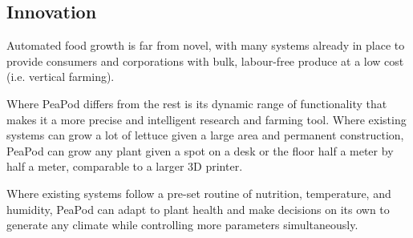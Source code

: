\documentclass{report}
\begin{document}
\subsection{Innovation}
\label{sec:innovation}






Automated food growth is far from novel, with many systems already in place to provide consumers and corporations with bulk, labour-free produce at a low cost (i.e. vertical farming). 

Where PeaPod differs from the rest is its dynamic range of functionality that makes it a more precise and intelligent research and farming tool. Where existing systems can grow a lot of lettuce given a large area and permanent construction, PeaPod can grow any plant given a spot on a desk or the floor half a meter by half a meter, comparable to a larger 3D printer. 

Where existing systems follow a pre-set routine of nutrition, temperature, and humidity, PeaPod can adapt to plant health and make decisions on its own to generate any climate while controlling more parameters simultaneously. 

\end{document}
